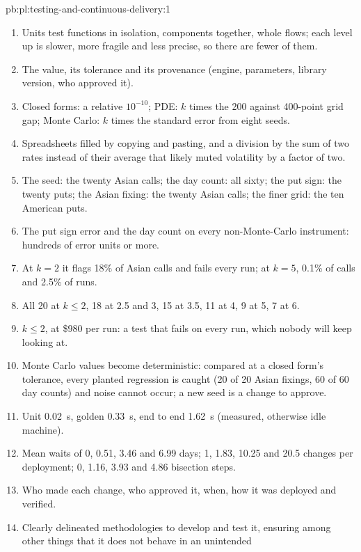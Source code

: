 \begin{solution}{pb:pl:testing-and-continuous-delivery:1}
\begin{enumerate}
\item Units test functions in isolation,  components together,  whole flows; each level up is slower, more
fragile and less precise, so there are fewer of them.
\item The value, its tolerance and its provenance (engine, parameters, library version, who approved it).
\item Closed forms: a relative $10^{-10}$; PDE: $k$ times the 200 against 400-point grid gap; Monte Carlo: $k$ times the standard error from
eight seeds.
\item Spreadsheets filled by copying and pasting, and a division by the sum of two rates instead of their average that likely muted
volatility by a factor of two.
\item The seed: the twenty Asian calls; the day count: all sixty; the put sign: the twenty puts; the Asian fixing: the twenty Asian calls;
the finer grid: the ten American puts.
\item The put sign error and the day count on every non-Monte-Carlo instrument: hundreds of error units or more.
\item At $k=2$ it flags 18\% of Asian calls and fails every run; at $k=5$, 0.1\% of calls and 2.5\% of runs.
\item All 20 at $k\le2$, 18 at 2.5 and 3, 15 at 3.5, 11 at 4, 9 at 5, 7 at 6.
\item $k\le2$, at \$980 per run: a test that fails on every run, which nobody will keep looking at.
\item Monte Carlo values become deterministic: compared at a closed form's tolerance, every planted regression is caught (20 of 20 Asian
fixings, 60 of 60 day counts) and noise cannot occur; a new seed is a change to approve.
\item Unit 0.02~s, golden 0.33~s, end to end 1.62~s (measured, otherwise idle machine).
\item Mean waits of 0, 0.51, 3.46 and 6.99 days; 1, 1.83, 10.25 and 20.5 changes per deployment; 0, 1.16, 3.93 and 4.86 bisection steps.
\item Who made each change, who approved it, when, how it was deployed and verified.
\item Clearly delineated methodologies to develop and test it, ensuring among other things that it does not behave in an unintended

\end{enumerate}
\end{solution}
